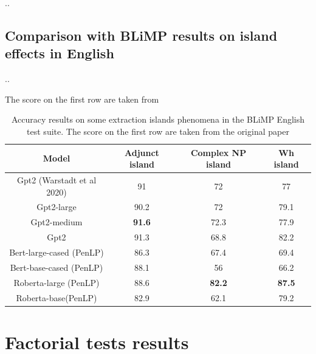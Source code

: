 ..


\subsection{Comparison with BLiMP results on island effects in English}

..

The score on the first row are taken from \citet{warstadt2020blimp}

\begin{table} 
	\begin{center}
		\begin{tabular}{c|c|c|c} 
			Model & \textbf{Adjunct island} & \textbf{Complex NP island} & \textbf{Wh island} \\
			\hline
			Gpt2 (Warstadt et al 2020) 	& 91 			& 72 			& 77 \\ 
			Gpt2-large 					& 90.2 			& 72 			& 79.1 \\ 
	  		Gpt2-medium 				& \textbf{91.6} & 72.3			& 77.9 \\
	  		Gpt2 						& 91.3 			& 68.8 			& 82.2 \\
	  		Bert-large-cased (PenLP)	& 86.3			& 67.4 			& 69.4 \\
	  		Bert-base-cased (PenLP)		& 88.1 			& 56 			& 66.2 \\
	  		Roberta-large (PenLP)		& 88.6			& \textbf{82.2}	& \textbf{87.5} \\
	  		Roberta-base(PenLP)			& 82.9			& 62.1 			& 79.2 \\   
	  		 
		\end{tabular}
		\caption{Accuracy results on some extraction islands phenomena in the BLiMP English test suite. The score on the first row are taken from the original paper \citet{warstadt2020blimp}}
		\label{tab:accResultsBLiMP}
	\end{center}
\end{table}

\section{Factorial tests results}

